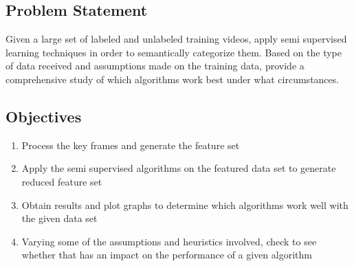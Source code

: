 \documentclass[a4paper,12pt]{article}
\begin{document}
\subsection{Problem Statement}
Given a large set of labeled and unlabeled training videos, apply semi supervised learning techniques in order to semantically categorize them. Based on the type of data received and assumptions made on the training data, provide a comprehensive study of which algorithms work best under what circumstances.


\subsection{Objectives}
\begin{enumerate}
\item Process the key frames and generate the feature set
\item Apply the semi supervised algorithms on the featured data set to generate reduced feature set
\item Obtain results and plot graphs to determine which algorithms work well with the given data set
\item Varying some of the assumptions and heuristics involved, check to see whether that has an impact on the performance of a given algorithm 

\end{enumerate}


\newpage
\end{document}
